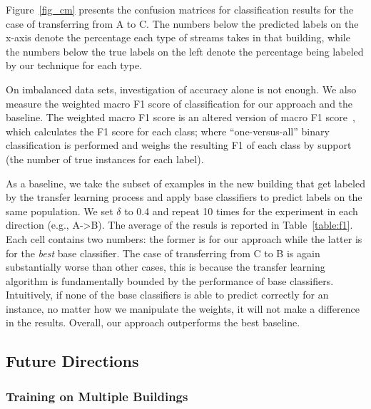 Figure~\ref{fig_cm} presents the confusion matrices for classification results for the case of transferring from A to C.
The numbers below the predicted labels on the x-axis denote the percentage each type of streams takes in that building, while the numbers below the true labels on the left denote the percentage being labeled by our technique for each type.

On imbalanced data sets, investigation of accuracy alone is not enough. We also measure the weighted macro F1 score of 
classification for our approach and the baseline. The weighted macro F1 score is an altered version of macro F1 score~\cite{yang}, 
which calculates the F1 score for each class; where ``one-versus-all'' binary classification is performed and weighs the resulting F1 of each class by support (the number of true instances for each label). 

As a baseline, we take the subset of examples in the new building that get labeled by the transfer learning process and apply base classifiers to predict labels on the same population. 
We set $\delta$ to 0.4 and  
repeat 10 times for the experiment in each direction (e.g., A->B). The average of the resuls is reported in Table~\ref{table:f1}. 
Each cell contains two numbers: the former is for our approach while the latter is for the {\it best} base classifier.
The case of transferring from C to B is again substantially worse than other cases, this is because the transfer learning algorithm is fundamentally bounded by the performance of base classifiers. 
Intuitively, if none of the base classifiers is able to predict correctly for an instance, no matter how we manipulate the weights, it will not make a difference in the results.
Overall, our approach outperforms the best baseline.


\subsection{Future Directions}
\subsubsection{Training on Multiple Buildings}

